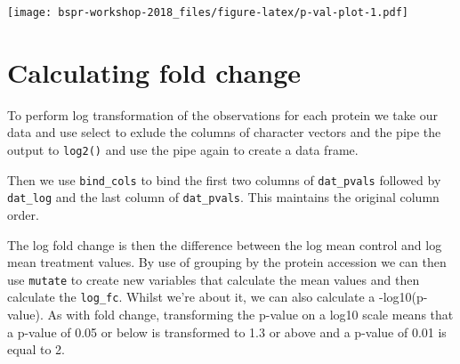\documentclass[12pt,]{book}
\newenvironment{Shaded}{\begin{snugshade}}{\end{snugshade}}
\newcommand{\KeywordTok}[1]{\textcolor[rgb]{0.13,0.29,0.53}{\textbf{#1}}}
\newcommand{\DecValTok}[1]{\textcolor[rgb]{0.00,0.00,0.81}{#1}}
\newcommand{\StringTok}[1]{\textcolor[rgb]{0.31,0.60,0.02}{#1}}
\newcommand{\CommentTok}[1]{\textcolor[rgb]{0.56,0.35,0.01}{\textit{#1}}}
\newcommand{\OperatorTok}[1]{\textcolor[rgb]{0.81,0.36,0.00}{\textbf{#1}}}
\newcommand{\NormalTok}[1]{#1}
\theoremstyle{definition}
\theoremstyle{definition}
\theoremstyle{definition}
\theoremstyle{remark}
\begin{document}
\texttt{[image: bspr-workshop-2018\_files/figure-latex/p-val-plot-1.pdf]}

\section{Calculating fold change}\label{calculating-fold-change}

To perform log transformation of the observations for each protein we
take our data and use select to exlude the columns of character vectors
and the pipe the output to \texttt{log2()} and use the pipe again to
create a data frame.

Then we use \texttt{bind\_cols} to bind the first two columns of
\texttt{dat\_pvals} followed by \texttt{dat\_log} and the last column of
\texttt{dat\_pvals}. This maintains the original column order.

\begin{Shaded}
\end{Shaded}

The log fold change is then the difference between the log mean control
and log mean treatment values. By use of grouping by the protein
accession we can then use \texttt{mutate} to create new variables that
calculate the mean values and then calculate the \texttt{log\_fc}.
Whilst we're about it, we can also calculate a -log10(p-value). As with
fold change, transforming the p-value on a log10 scale means that a
p-value of 0.05 or below is transformed to 1.3 or above and a p-value of
0.01 is equal to 2.
\end{document}
